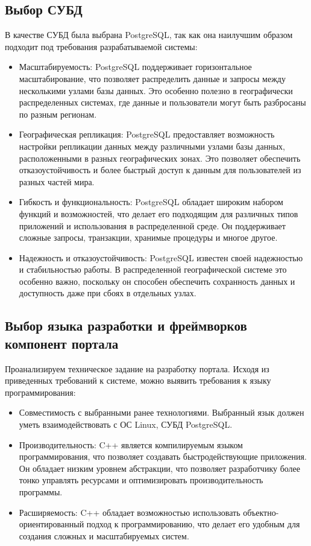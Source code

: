 \subsection*{Выбор СУБД}
В качестве СУБД была выбрана PostgreSQL, так как она наилучшим образом подходит под требования разрабатываемой системы:
\begin{itemize}
    \item Масштабируемость: PostgreSQL поддерживает горизонтальное масштабирование, что позволяет распределить данные и запросы между несколькими узлами базы данных. Это особенно полезно в географически распределенных системах, где данные и пользователи могут быть разбросаны по разным регионам.
    \item Географическая репликация: PostgreSQL предоставляет возможность настройки репликации данных между различными узлами базы данных, расположенными в разных географических зонах. Это позволяет обеспечить отказоустойчивость и более быстрый доступ к данным для пользователей из разных частей мира.
    \item Гибкость и функциональность: PostgreSQL обладает широким набором функций и возможностей, что делает его подходящим для различных типов приложений и использования в распределенной среде. Он поддерживает сложные запросы, транзакции, хранимые процедуры и многое другое.
    \item Надежность и отказоустойчивость: PostgreSQL известен своей надежностью и стабильностью работы. В распределенной географической системе это особенно важно, поскольку он способен обеспечить сохранность данных и доступность даже при сбоях в отдельных узлах.
\end{itemize}

\subsection*{Выбор языка разработки и фреймворков компонент портала}
Проанализируем техническое задание на разработку портала. Исходя из приведенных требований к системе, можно выявить требования к языку программирования:
\begin{itemize}
    \item Совместимость с выбранными ранее технологиями. Выбранный язык должен уметь взаимодействовать с ОС Linux, СУБД PostgreSQL.
    \item Производительность: C++ является компилируемым языком программирования, что позволяет создавать быстродействующие приложения. Он обладает низким уровнем абстракции, что позволяет разработчику более тонко управлять ресурсами и оптимизировать производительность программы.
    \item Расширяемость: C++ обладает возможностью использовать объектно-ориентированный подход к программированию, что делает его удобным для создания сложных и масштабируемых систем.
\end{itemize}

